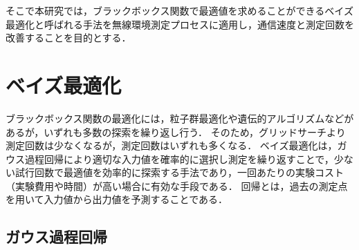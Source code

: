 \documentclass[twocolumn]{ltjarticle}
\begin{document}
そこで本研究では，ブラックボックス関数で最適値を求めることができるベイズ最適化と呼ばれる手法を無線環境測定プロセスに適用し，通信速度と測定回数を改善することを目的とする．

\section{ベイズ最適化}

ブラックボックス関数の最適化には，粒子群最適化や遺伝的アルゴリズムなどがあるが，いずれも多数の探索を繰り返し行う．
そのため，グリッドサーチより測定回数は少なくなるが，測定回数はいずれも多くなる．
ベイズ最適化は，ガウス過程回帰により適切な入力値を確率的に選択し測定を繰り返すことで，少ない試行回数で最適値を効率的に探索する手法であり，一回あたりの実験コスト（実験費用や時間）が高い場合に有効な手段である．
回帰とは，過去の測定点を用いて入力値から出力値を予測することである．

\subsection{ガウス過程回帰}
\end{document}
